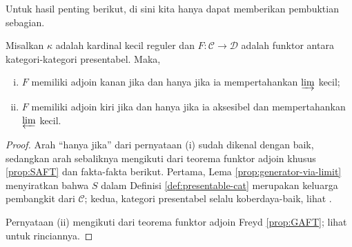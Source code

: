 Untuk hasil penting berikut, di sini kita hanya dapat memberikan pembuktian sebagian.

\begin{theorem}
	Misalkan $\kappa$ adalah kardinal kecil reguler dan $F: \mathcal{C} \to \mathcal{D}$ adalah funktor antara kategori-kategori presentabel. Maka,
	\begin{enumerate}[(i)]
		\item $F$ memiliki adjoin kanan jika dan hanya jika ia mempertahankan $\varinjlim$ kecil;
		\item $F$ memiliki adjoin kiri jika dan hanya jika ia aksesibel dan mempertahankan $\varprojlim$ kecil.
	\end{enumerate}
\end{theorem}
\begin{proof}
	Arah ``hanya jika'' dari pernyataan (i) sudah dikenal dengan baik, sedangkan arah sebaliknya mengikuti dari teorema funktor adjoin khusus \ref{prop:SAFT} dan fakta-fakta berikut. Pertama, Lema \ref{prop:generator-via-limit} menyiratkan bahwa $S$ dalam Definisi \ref{def:presentable-cat} merupakan keluarga pembangkit dari $\mathcal{C}$; kedua, kategori presentabel selalu koberdaya-baik, lihat \cite[Teorema 1.58]{AR94}.
	
	Pernyataan (ii) mengikuti dari teorema funktor adjoin Freyd \ref{prop:GAFT}; lihat \cite[Teorema 1.66]{AR94} untuk rinciannya.
\end{proof}
